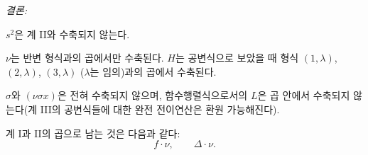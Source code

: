 
\noindent\emph{결론:}

$s^2$은 계 II와 수축되지 않는다.

$\nu$는 반변 형식과의 곱에서만 수축된다. $H$는 공변식으로 보았을 때 형식 $(1,\lambda)$, $(2,\lambda)$, $(3,\lambda)$ ($\lambda$는 임의)과의 곱에서 수축된다.

$\sigma$와 $(\nu\sigma x)$은 전혀 수축되지 않으며, 함수행렬식으로서의 $L$은 곱 안에서 수축되지 않는다(계 III의 공변식들에 대한 완전 전이연산은 환원 가능해진다).

계 I과 II의 곱으로 남는 것은 다음과 같다:
\[
f\cdot \nu,\qquad \Delta\cdot \nu.
\]
